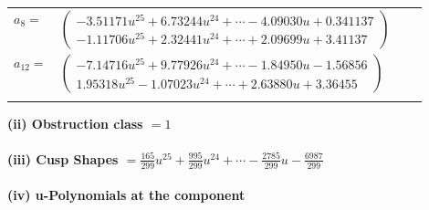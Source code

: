 \documentclass[1p]{elsarticle_modified}
\theoremstyle{definition}
\begin{document}
\begin{tabular}{m{7pt} m{180pt} m{7pt} m{180pt} }
\flushright $a_{8}=$&$\begin{pmatrix}-3.51171 u^{25}+6.73244 u^{24}+\cdots-4.09030 u+0.341137\\-1.11706 u^{25}+2.32441 u^{24}+\cdots+2.09699 u+3.41137\end{pmatrix}$ \\
\flushright $a_{12}=$&$\begin{pmatrix}-7.14716 u^{25}+9.77926 u^{24}+\cdots-1.84950 u-1.56856\\1.95318 u^{25}-1.07023 u^{24}+\cdots+2.63880 u+3.36455\end{pmatrix}$\\&\end{tabular}
\flushleft \textbf{(ii) Obstruction class $= 1$}\\~\\
\flushleft \textbf{(iii) Cusp Shapes $= \frac{165}{299} u^{25}+\frac{995}{299} u^{24}+\cdots-\frac{2785}{299} u-\frac{6987}{299}$}\\~\\
\newpage\renewcommand{\arraystretch}{1}
\flushleft \textbf{(iv) u-Polynomials at the component}\newline \\
\end{document}
